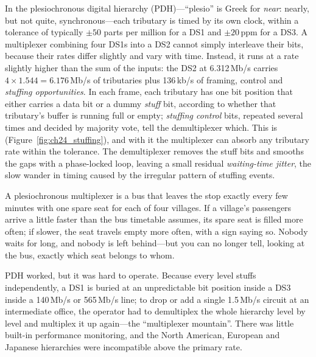 In the plesiochronous digital hierarchy (PDH)---``plesio'' is Greek for \emph{near}: nearly, but not
quite, synchronous---each tributary is timed by its own clock, within a tolerance of typically
$\pm50$ parts per million for a DS1 and $\pm20$\,ppm for a DS3. A multiplexer combining four DS1s into
a DS2 cannot simply interleave their bits, because their rates differ slightly and vary with time.
Instead, it runs at a rate slightly higher than the sum of the inputs: the DS2 at 6.312\,Mb/s
carries $4\times1.544=6.176$\,Mb/s of tributaries plus 136\,kb/s of framing, control and
\emph{stuffing opportunities}. In each frame, each tributary has one bit position that either
carries a data bit or a dummy \emph{stuff} bit, according to whether that tributary's buffer is
running full or empty; \emph{stuffing control} bits, repeated several times and decided by majority
vote, tell the demultiplexer which. This is 
(Figure~\ref{fig:ch24_stuffing}), and with it the multiplexer can absorb any tributary rate within
the tolerance. The demultiplexer removes the stuff bits and smooths the gaps with a phase-locked
loop, leaving a small residual \emph{waiting-time jitter}, the slow wander in timing caused by the
irregular pattern of stuffing events.


\begin{analogy}
A plesiochronous multiplexer is a bus that leaves the stop exactly every few minutes with one
spare seat for each of four villages. If a village's passengers arrive a little faster than the
bus timetable assumes, its spare seat is filled more often; if slower, the seat travels empty
more often, with a sign saying so. Nobody waits for long, and nobody is left behind---but you can
no longer tell, looking at the bus, exactly which seat belongs to whom.
\end{analogy}

PDH worked, but it was hard to operate. Because every level stuffs independently, a DS1 is buried
at an unpredictable bit position inside a DS3 inside a 140\,Mb/s or 565\,Mb/s line; to drop or add a
single 1.5\,Mb/s circuit at an intermediate office, the operator had to demultiplex the whole
hierarchy level by level and multiplex it up again---the ``multiplexer mountain''. There was little
built-in performance monitoring, and the North American, European and Japanese hierarchies were
incompatible above the primary rate.

